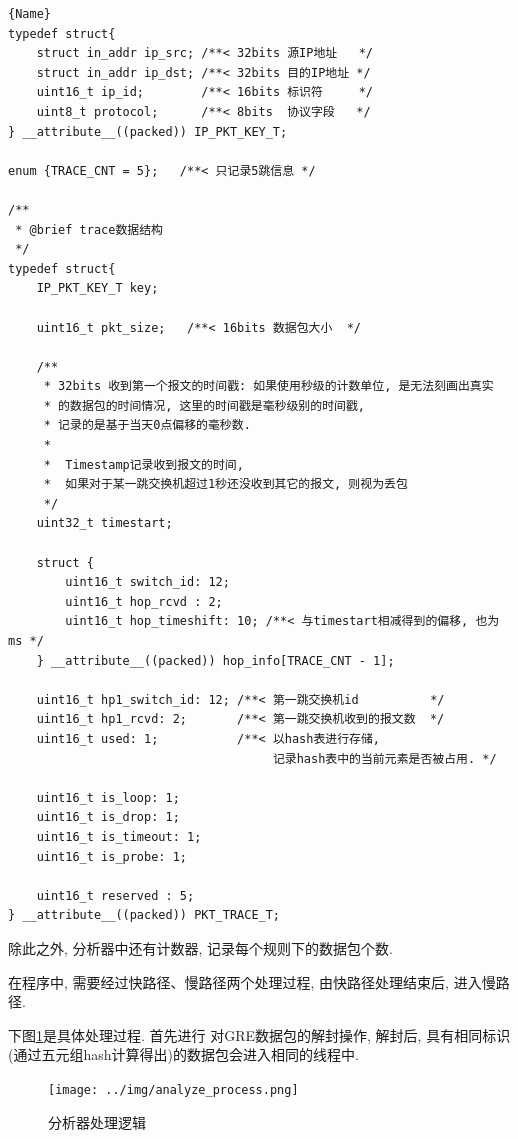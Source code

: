 \label{trace数据结构}
\begin{lstlisting}[caption=Trace数据结构,frame=tlrb]{Name}
typedef struct{
    struct in_addr ip_src; /**< 32bits 源IP地址   */
    struct in_addr ip_dst; /**< 32bits 目的IP地址 */
    uint16_t ip_id;        /**< 16bits 标识符     */
    uint8_t protocol;      /**< 8bits  协议字段   */
} __attribute__((packed)) IP_PKT_KEY_T;

enum {TRACE_CNT = 5};   /**< 只记录5跳信息 */

/**
 * @brief trace数据结构
 */
typedef struct{
    IP_PKT_KEY_T key;

    uint16_t pkt_size;   /**< 16bits 数据包大小  */

    /**
     * 32bits 收到第一个报文的时间戳: 如果使用秒级的计数单位, 是无法刻画出真实
     * 的数据包的时间情况, 这里的时间戳是毫秒级别的时间戳,
     * 记录的是基于当天0点偏移的毫秒数.
     *
     *  Timestamp记录收到报文的时间,
     *  如果对于某一跳交换机超过1秒还没收到其它的报文, 则视为丢包
     */
    uint32_t timestart;

    struct {
        uint16_t switch_id: 12;
        uint16_t hop_rcvd : 2;
        uint16_t hop_timeshift: 10; /**< 与timestart相减得到的偏移, 也为ms */
    } __attribute__((packed)) hop_info[TRACE_CNT - 1];

    uint16_t hp1_switch_id: 12; /**< 第一跳交换机id          */
    uint16_t hp1_rcvd: 2;       /**< 第一跳交换机收到的报文数  */
    uint16_t used: 1;           /**< 以hash表进行存储,
                                     记录hash表中的当前元素是否被占用. */

    uint16_t is_loop: 1;
    uint16_t is_drop: 1;
    uint16_t is_timeout: 1;
    uint16_t is_probe: 1;

    uint16_t reserved : 5;
} __attribute__((packed)) PKT_TRACE_T;
\end{lstlisting}


除此之外, 分析器中还有计数器, 记录每个规则下的数据包个数.

在程序中, 需要经过快路径、慢路径两个处理过程, 由快路径处理结束后,
进入慢路径.

下图\ref{fig:analyzer_process}是具体处理过程. 首先进行
对GRE数据包的解封操作, 解封后,
具有相同标识(通过五元组hash计算得出)的数据包会进入相同的线程中.

\begin{figure}
  \centering
  \texttt{[image: ../img/analyze\_process.png]}
  \caption{分析器处理逻辑}
  \label{fig:analyzer_process}
\end{figure}

